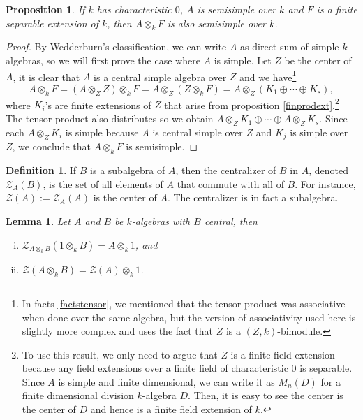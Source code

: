 \documentclass{tufte-handout} %
\newtheorem{prop}[thm]{Proposition}
\newtheorem{lem}[thm]{Lemma}
\theoremstyle{definition}
\newtheorem{defn}[thm]{Definition}
\theoremstyle{remark}
\newcommand{\mZ}{\mathcal{Z}}
\begin{document}
\begin{prop}
	If $k$ has characteristic $0$, $A$ is semisimple over $k$ and $F$ is a finite separable extension of $k$, then $A \otimes_k F$ is also semisimple over $k$.
\end{prop}
\begin{proof}
	By Wedderburn's classification, we can write $A$ as direct sum of simple $k$-algebras, so we will first prove the case where $A$ is simple. Let $Z$ be the center of $A$, it is clear that $A$ is a central simple algebra over $Z$ and we have\footnote{In facts \ref{factstensor}, we mentioned that the tensor product was associative when done over the same algebra, but the version of associativity used here is slightly more complex and uses the fact that $Z$ is a $(Z,k)$-bimodule.}
	\[A \otimes_k F = (A \otimes_Z Z) \otimes_k F= A \otimes_Z (Z \otimes_k F) = A \otimes_Z (K_1 \oplus \cdots \oplus K_s),\]
	where $K_i$'s are finite extensions of $Z$ that arise from proposition \ref{finprodext}.\footnote{To use this result, we only need to argue that $Z$ is a finite field extension because any field extensions over a finite field of characteristic $0$ is separable. Since $A$ is simple and finite dimensional, we can write it as $M_n(D)$ for a finite dimensional division $k$-algebra $D$. Then, it is easy to see the center is the center of $D$ and hence is a finite field extension of $k$.} The tensor product also distributes so we obtain $A \otimes_Z K_1 \oplus \cdots \oplus A \otimes_Z K_s$. Since each $A \otimes_Z K_i$ is simple because $A$ is central simple over $Z$ and $K_j$ is simple over $Z$, we conclude that $A \otimes_k F$ is semisimple.
\end{proof}
\begin{defn}
	If $B$ is a subalgebra of $A$, then the centralizer of $B$ in $A$, denoted $\mZ_A(B)$, is the set of all elements of $A$ that commute with all of $B$. For instance, $\mZ(A) := \mZ_A(A)$ is the center of $A$. The centralizer is in fact a subalgebra.
\end{defn}
\begin{lem}\label{centeroftensor}
	Let $A$ and $B$ be $k$-algebras with $B$ central, then 
	\begin{enumerate}[i.]
		\item $\mZ_{A \otimes_k B}(1 \otimes_k B) = A \otimes_k 1$, and
		\item $\mZ(A \otimes_k B) =\mZ(A) \otimes_k 1$.
	\end{enumerate}
\end{lem}
\end{document}
